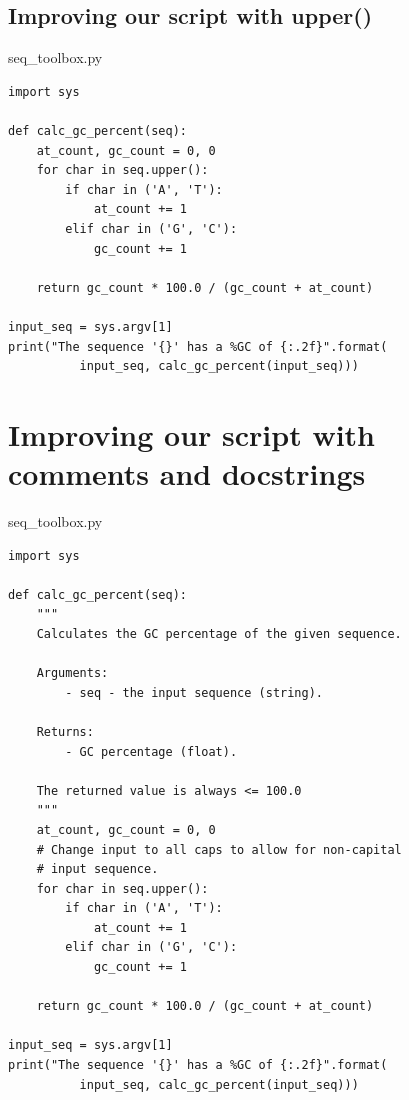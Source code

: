 \documentclass[aspectratio=1610,slidestop]{beamer}
\begin{document}
\subsection{Improving our script with upper()}
\begin{pframe}
 \begin{pythonfile}{seq\_toolbox.py}
  \begin{verbatim}
import sys

def calc_gc_percent(seq):
    at_count, gc_count = 0, 0
    for char in seq.upper():
        if char in ('A', 'T'):
            at_count += 1
        elif char in ('G', 'C'):
            gc_count += 1

    return gc_count * 100.0 / (gc_count + at_count)

input_seq = sys.argv[1]
print("The sequence '{}' has a %GC of {:.2f}".format(
          input_seq, calc_gc_percent(input_seq)))
  \end{verbatim}
 \end{pythonfile}
\end{pframe}


\section{Improving our script with comments and docstrings}
\begin{pframe}
  \vspace{-1.2cm}
 \begin{pythonfile}{seq\_toolbox.py}
  \begin{tiny}
  \begin{verbatim}
import sys

def calc_gc_percent(seq):
    """
    Calculates the GC percentage of the given sequence.

    Arguments:
        - seq - the input sequence (string).

    Returns:
        - GC percentage (float).

    The returned value is always <= 100.0
    """
    at_count, gc_count = 0, 0
    # Change input to all caps to allow for non-capital
    # input sequence.
    for char in seq.upper():
        if char in ('A', 'T'):
            at_count += 1
        elif char in ('G', 'C'):
            gc_count += 1

    return gc_count * 100.0 / (gc_count + at_count)

input_seq = sys.argv[1]
print("The sequence '{}' has a %GC of {:.2f}".format(
          input_seq, calc_gc_percent(input_seq)))
  \end{verbatim}
  \end{tiny}
 \end{pythonfile}
\end{pframe}
\end{document}
